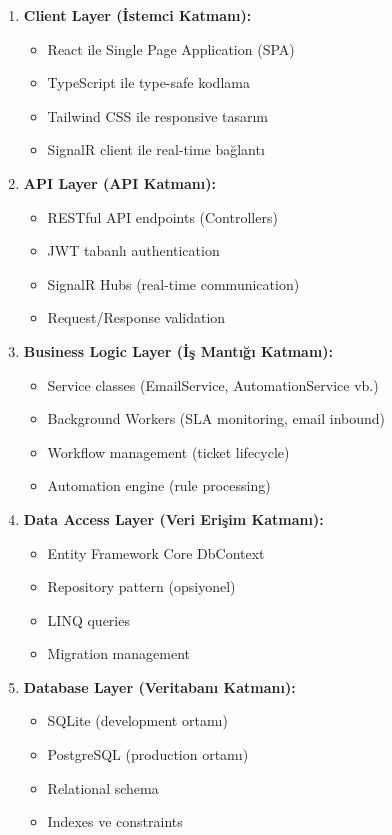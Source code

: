 \documentclass[12pt,a4paper]{article}
\begin{document}
\begin{enumerate}
    \item \textbf{Client Layer (İstemci Katmanı):}
    \begin{itemize}
        \item React ile Single Page Application (SPA)
        \item TypeScript ile type-safe kodlama
        \item Tailwind CSS ile responsive tasarım
        \item SignalR client ile real-time bağlantı
    \end{itemize}
    
    \item \textbf{API Layer (API Katmanı):}
    \begin{itemize}
        \item RESTful API endpoints (Controllers)
        \item JWT tabanlı authentication
        \item SignalR Hubs (real-time communication)
        \item Request/Response validation
    \end{itemize}
    
    \item \textbf{Business Logic Layer (İş Mantığı Katmanı):}
    \begin{itemize}
        \item Service classes (EmailService, AutomationService vb.)
        \item Background Workers (SLA monitoring, email inbound)
        \item Workflow management (ticket lifecycle)
        \item Automation engine (rule processing)
    \end{itemize}
    
    \item \textbf{Data Access Layer (Veri Erişim Katmanı):}
    \begin{itemize}
        \item Entity Framework Core DbContext
        \item Repository pattern (opsiyonel)
        \item LINQ queries
        \item Migration management
    \end{itemize}
    
    \item \textbf{Database Layer (Veritabanı Katmanı):}
    \begin{itemize}
        \item SQLite (development ortamı)
        \item PostgreSQL (production ortamı)
        \item Relational schema
        \item Indexes ve constraints
    \end{itemize}
\end{enumerate}
\end{document}
